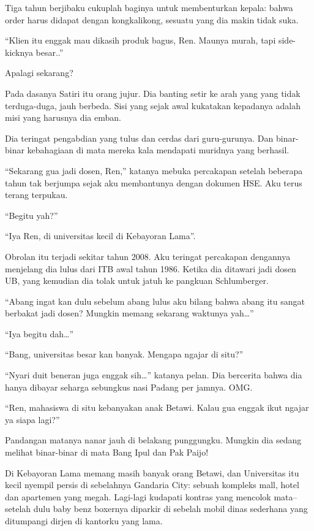 Tiga tahun berjibaku cukuplah baginya untuk membenturkan kepala: bahwa order harus didapat dengan kongkalikong, sesuatu yang dia makin tidak suka.

“Klien itu enggak mau dikasih produk bagus, Ren. Maunya murah, tapi side-kicknya besar..”

Apalagi sekarang?

Pada dasanya Satiri itu orang jujur. Dia banting setir ke arah yang yang tidak terduga-duga, jauh berbeda. Sisi yang sejak awal kukatakan kepadanya adalah misi yang harusnya dia emban.

Dia teringat pengabdian yang tulus dan cerdas dari guru-gurunya. Dan binar-binar kebahagiaan di mata mereka kala mendapati muridnya yang berhasil.

“Sekarang gua jadi dosen, Ren,” katanya mebuka percakapan setelah beberapa tahun tak berjumpa sejak aku membantunya dengan dokumen HSE. Aku terus terang terpukau.

“Begitu yah?”

“Iya Ren, di universitas kecil di Kebayoran Lama”.

Obrolan itu terjadi sekitar tahun 2008. Aku teringat percakapan dengannya menjelang dia lulus dari ITB awal tahun 1986. Ketika dia ditawari jadi dosen UB, yang kemudian dia tolak untuk jatuh ke pangkuan Schlumberger.

“Abang ingat kan dulu sebelum abang lulus aku bilang bahwa abang itu sangat berbakat jadi dosen? Mungkin memang sekarang waktunya yah…”

“Iya begitu dah…”

“Bang, universitas besar kan banyak. Mengapa ngajar di situ?”

“Nyari duit beneran juga enggak sih…” katanya pelan. Dia bercerita bahwa dia hanya dibayar seharga sebungkus nasi Padang per jamnya. OMG.

“Ren, mahasiswa di situ kebanyakan anak Betawi. Kalau gua enggak ikut ngajar ya siapa lagi?”

Pandangan matanya nanar jauh di belakang punggungku. Mungkin dia sedang melihat binar-binar di mata Bang Ipul dan Pak Paijo!

Di Kebayoran Lama memang masih banyak orang Betawi, dan Universitas itu kecil nyempil persis di sebelahnya Gandaria City: sebuah kompleks mall, hotel dan apartemen yang megah. Lagi-lagi kudapati kontras yang mencolok mata–setelah dulu baby benz boxernya diparkir di sebelah mobil dinas sederhana yang ditumpangi dirjen di kantorku yang lama.

